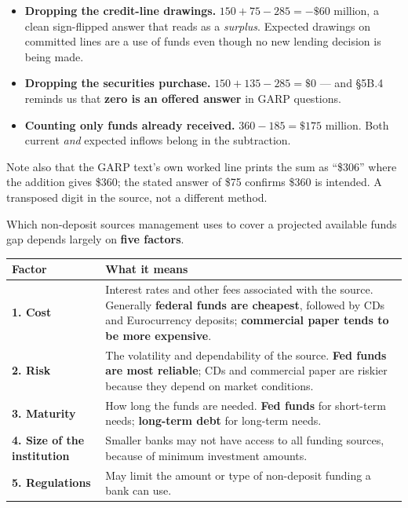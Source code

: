 \begin{lrtrapbox}
\begin{itemize}
\item \textbf{Dropping the credit-line drawings.} $150 + 75 - 285 = -\$60$ million, a clean sign-flipped answer that reads as a \emph{surplus}. Expected drawings on committed lines are a use of funds even though no new lending decision is being made.
\item \textbf{Dropping the securities purchase.} $150 + 135 - 285 = \$0$ --- and \S5B.4 reminds us that \textbf{zero is an offered answer} in GARP questions.
\item \textbf{Counting only funds already received.} $360 - 185 = \$175$ million. Both current \emph{and} expected inflows belong in the subtraction.
\end{itemize}
Note also that the GARP text's own worked line prints the sum as ``\$306'' where the addition gives \$360; the stated answer of \$75 confirms \$360 is intended. A transposed digit in the source, not a different method.
\end{lrtrapbox}


Which non-deposit sources management uses to cover a projected available funds gap depends largely on \textbf{five factors}.

\begin{center}
\small
\begin{tabularx}{\textwidth}{@{}p{3.6cm} X@{}}
\toprule
\rowcolor{FRMSoft}\textbf{Factor} & \textbf{What it means} \\
\midrule
\textbf{1. Cost} & Interest rates and other fees associated with the source. Generally \textbf{federal funds are cheapest}, followed by CDs and Eurocurrency deposits; \textbf{commercial paper tends to be more expensive}. \\
\addlinespace
\textbf{2. Risk} & The volatility and dependability of the source. \textbf{Fed funds are most reliable}; CDs and commercial paper are riskier because they depend on market conditions. \\
\addlinespace
\textbf{3. Maturity} & How long the funds are needed. \textbf{Fed funds} for short-term needs; \textbf{long-term debt} for long-term needs. \\
\addlinespace
\textbf{4. Size of the institution} & Smaller banks may not have access to all funding sources, because of minimum investment amounts. \\
\addlinespace
\textbf{5. Regulations} & May limit the amount or type of non-deposit funding a bank can use. \\
\bottomrule
\end{tabularx}
\end{center}

